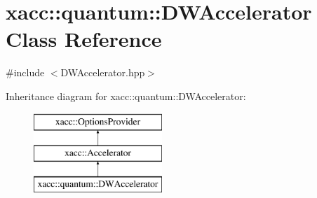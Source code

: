 \hypertarget{a00029}{}\section{xacc\+:\+:quantum\+:\+:D\+W\+Accelerator Class Reference}
\label{a00029}


{\ttfamily \#include $<$D\+W\+Accelerator.\+hpp$>$}

Inheritance diagram for xacc\+:\+:quantum\+:\+:D\+W\+Accelerator\+:\begin{figure}[H]
\begin{center}
\leavevmode
\includegraphics[height=3.000000cm]{a00029}
\end{center}
\end{figure}
